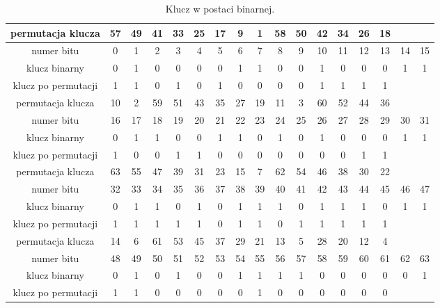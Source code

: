 \documentclass[12p]{article}
\begin{document}
\begin{table}[H]
\centering
\begin{tabular}{|c|c|c|c|c|c|c|c|c|c|c|c|c|c|c|c|c|}
\hline
permutacja klucza & 57 & 49 & 41 & 33 & 25 & 17 & 9 & 1 & 58 & 50 & 42 & 34 & 26 & 18 & &\\
\hline
numer bitu & 0 & 1 & 2 & 3 & 4 & 5 & 6 & 7 & 8 & 9 & 10 & 11 & 12 & 13 & 14 & 15\\
\hline
klucz binarny & 0 & 1 & 0 & 0 & 0 & 0 & 1 & 1 & 0 & 0 & 1 & 0 & 0 & 0 & 1 & 1\\
\hline
klucz po permutacji & 1 & 1 & 0 & 1 & 0 & 1 & 0 & 0 & 0 & 0 & 1 & 1 & 1 & 1 &&\\

\hline
\hline
permutacja klucza & 10 & 2 & 59 & 51 & 43 & 35 & 27 & 19 & 11 & 3 & 60 & 52 & 44 & 36 &&\\
\hline
numer bitu & 16 & 17 & 18 & 19 & 20 & 21 & 22 & 23 & 24 & 25 & 26 & 27 & 28 & 29 & 30 & 31\\
\hline
klucz binarny & 0 & 1 & 1 & 0 & 0 & 1 & 1 & 0 & 1 & 0 & 1 & 0 & 0 & 0 & 1 & 1\\
\hline 
klucz po permutacji & 1 & 0 & 0 & 1 & 1 & 0 & 0 & 0 & 0 & 0 & 0 & 0 & 1 & 1 &&\\

\hline
\hline
permutacja klucza & 63 & 55 & 47 & 39 & 31 & 23 & 15 & 7 & 62 & 54 & 46 & 38 & 30 & 22 &&\\
\hline
numer bitu & 32 & 33 & 34 & 35 & 36 & 37 & 38 & 39 & 40 & 41 & 42 & 43 & 44 & 45 & 46 & 47 \\
\hline
klucz binarny & 0 & 1 & 1 & 0 & 1 & 0 & 1 & 1 & 1 & 0 & 1 & 1 & 1 & 0 & 1 & 1 \\
\hline
klucz po permutacji & 1 & 1 & 1 & 1 & 1 & 0 & 1 & 1 & 0 & 1 & 1 & 1 & 1 & 1 &&\\

\hline
\hline
permutacja klucza & 14 & 6 & 61 & 53 & 45 & 37 & 29 & 21 & 13 & 5 & 28 & 20 & 12 & 4 &&\\
\hline
numer bitu & 48 & 49 & 50 & 51 & 52 & 53 & 54 & 55 & 56 & 57 & 58 & 59 & 60 & 61 & 62 & 63\\
\hline
klucz binarny & 0 & 1 & 0 & 1 & 0 & 0 & 1 & 1 & 1 & 1 & 0 & 0 & 0 & 0 & 0 & 1\\
\hline 
klucz po permutacji & 1 & 1 & 0 & 0 & 0 & 0 & 0 & 1 & 0 & 0 & 0 & 0 & 0 & 0 &&\\
\hline
\end{tabular}
\caption{Klucz w postaci binarnej.}~\label{tabela_podstawienia}
\end{table}
\end{document}
